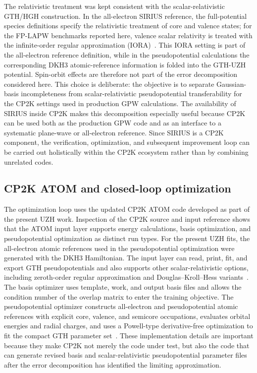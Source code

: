 \documentclass[aps,prb,reprint,amsmath,amssymb,superscriptaddress,longbibliography,floatfix]{revtex4-2}
\begin{document}
The relativistic treatment was kept consistent with the scalar-relativistic GTH/HGH construction. In the all-electron SIRIUS reference, the full-potential species definitions specify the relativistic treatment of core and valence states; for the FP-LAPW benchmarks reported here, valence scalar relativity is treated with the infinite-order regular approximation (IORA)~\cite{Dyall1999IORA}. This IORA setting is part of the all-electron reference definition, while in the pseudopotential calculations the corresponding DKH3 atomic-reference information is folded into the GTH-UZH potential. Spin-orbit effects are therefore not part of the error decomposition considered here. This choice is deliberate: the objective is to separate Gaussian-basis incompleteness from scalar-relativistic pseudopotential transferability for the CP2K settings used in production GPW calculations. The availability of SIRIUS inside CP2K makes this decomposition especially useful because CP2K can be used both as the production GPW code and as an interface to a systematic plane-wave or all-electron reference. Since SIRIUS is a CP2K component, the verification, optimization, and subsequent improvement loop can be carried out holistically within the CP2K ecosystem rather than by combining unrelated codes.

\subsection{CP2K ATOM and closed-loop optimization}

The optimization loop uses the updated CP2K ATOM code developed as part of the present UZH work. Inspection of the CP2K source and input reference shows that the ATOM input layer supports energy calculations, basis optimization, and pseudopotential optimization as distinct run types. For the present UZH fits, the all-electron atomic references used in the pseudopotential optimization were generated with the DKH3 Hamiltonian. The input layer can read, print, fit, and export GTH pseudopotentials and also supports other scalar-relativistic options, including zeroth-order regular approximation and Douglas--Kroll--Hess variants~\cite{CP2K2020,CP2KMadeSimple2026}. The basis optimizer uses template, work, and output basis files and allows the condition number of the overlap matrix to enter the training objective. The pseudopotential optimizer constructs all-electron and pseudopotential atomic references with explicit core, valence, and semicore occupations, evaluates orbital energies and radial charges, and uses a Powell-type derivative-free optimization to fit the compact GTH parameter set~\cite{Powell1964}. These implementation details are important because they make CP2K not merely the code under test, but also the code that can generate revised basis and scalar-relativistic pseudopotential parameter files after the error decomposition has identified the limiting approximation.
\end{document}
